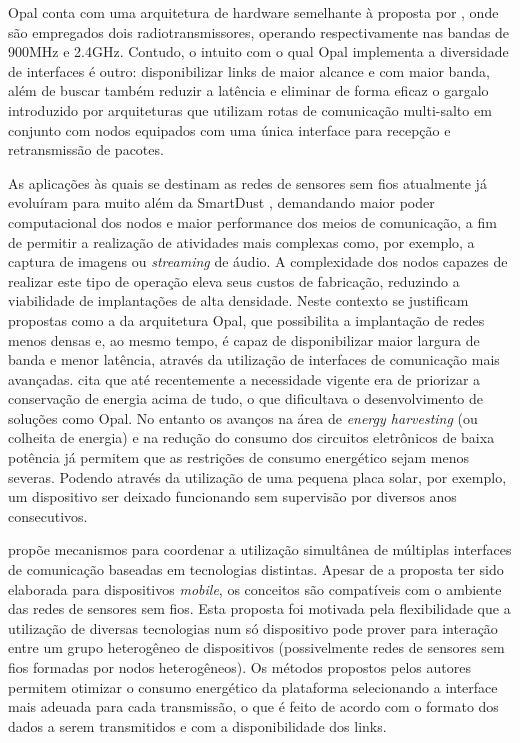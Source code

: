 \documentclass[
	12pt,				%
	openright,			%
	oneside,
	a4paper,			%
	english,			%
	french,				%
	spanish,			%
	brazil				%
	]{abntex2}
\begin{document}
Opal \cite{Jurdak2011} conta com uma arquitetura de hardware semelhante à proposta por \cite{Kusy2011}, onde são empregados dois radiotransmissores, operando respectivamente nas bandas de 900MHz e 2.4GHz. Contudo, o intuito com o qual Opal implementa a diversidade de interfaces é outro: disponibilizar links de maior alcance e com maior banda, além de buscar também reduzir a latência e eliminar de forma eficaz o gargalo introduzido por arquiteturas que utilizam rotas de comunicação multi-salto em conjunto com nodos equipados com uma única interface para recepção e retransmissão de pacotes. 

As aplicações às quais se destinam as redes de sensores sem fios atualmente já evoluíram para muito além da SmartDust \cite{Warneke2001}, demandando maior poder computacional dos nodos e maior performance dos meios de comunicação, a fim de permitir a realização de atividades mais complexas como, por exemplo, a captura de imagens ou \textit{streaming} de áudio. A complexidade dos nodos capazes de realizar este tipo de operação eleva seus custos de fabricação, reduzindo a viabilidade de implantações de alta densidade. Neste contexto se justificam propostas como a da arquitetura Opal, que possibilita a implantação de redes menos densas e, ao mesmo tempo, é capaz de disponibilizar maior largura de banda e menor latência, através da utilização de interfaces de comunicação mais avançadas.  cita que até recentemente a necessidade vigente era de priorizar a conservação de energia acima de tudo, o que dificultava o desenvolvimento de soluções como Opal. No entanto os avanços na área de \textit{energy harvesting} (ou  colheita de energia) e na redução do consumo dos circuitos eletrônicos de baixa potência já permitem que as restrições de consumo energético sejam menos severas. Podendo através da utilização de uma pequena placa solar, por exemplo, um dispositivo ser deixado funcionando sem supervisão por diversos anos consecutivos.

 propõe mecanismos para coordenar a utilização simultânea de múltiplas interfaces de comunicação baseadas em tecnologias distintas. Apesar de a proposta ter sido elaborada para dispositivos \textit{mobile}, os conceitos são compatíveis com o ambiente das redes de sensores sem fios. Esta proposta foi motivada pela flexibilidade que a utilização de diversas tecnologias num só dispositivo pode prover para interação entre um grupo heterogêneo de dispositivos (possivelmente redes de sensores sem fios formadas por nodos heterogêneos). Os métodos propostos pelos autores permitem otimizar o consumo energético da plataforma selecionando a interface mais adeuada para cada transmissão, o que é feito de acordo com o formato dos dados a serem transmitidos e com a disponibilidade dos links.
\end{document}

